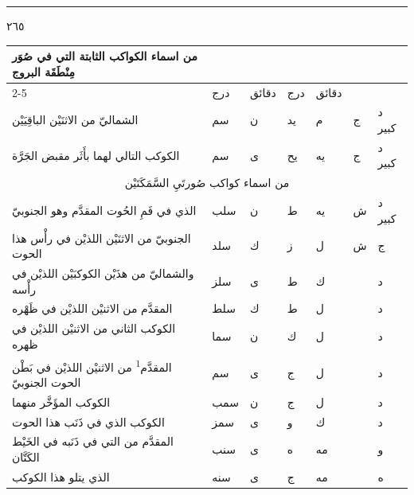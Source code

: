\documentclass[11pt]{article}
\begin{document}
\par\vspace{3mm}\noindent\rule{40mm}{.4pt}\par{}
\clearpage
{\large \textarabic{٢٦٥}}\par\vspace{2mm}
\begin{Arabic}\begin{tabular}{|p{84mm}|>{\centering\arraybackslash}p{9mm}|>{\centering\arraybackslash}p{9mm}|>{\centering\arraybackslash}p{9mm}|>{\centering\arraybackslash}p{9mm}|>{\centering\arraybackslash}p{14mm}|>{\centering\arraybackslash}p{17mm}|}\hline
\multirow{2}{*}{\parbox{80mm}{\centering من اسماء الكواكب الثابتة التي في صُوَر مِنْطَقَة البروج}} & \multicolumn{2}{c|}{الطول} & \multicolumn{2}{c|}{العرض} & \multirow{2}{*}{\parbox{13mm}{\centering\small علامات الجهة}} & \multirow{2}{*}{\parbox{16mm}{\centering\small مراتب العظمة}} \\ \cline{2-5}
 & {\small درج} & {\small دقائق} & {\small درج} & {\small دقائق} & & \\ \hline
الشماليّ من الاثنَيْن الباقِيَيْن & سم & ن & يد & م & ج & د كبير \\
الكوكب التالي لهما بأَثَر مقبض الجَرَّة & سم & ى & يح & يه & ج & د كبير \\
\hline
\multicolumn{7}{|c|}{\large من اسماء كواكب صُورتَيِ السَّمَكَتَيْن} \\ \hline
الذي في فَمِ الحُوت المقدَّم وهو الجنوبيّ & سلب & ن & ط & يه & ش & د كبير \\
الجنوبيّ من الاثنَيْن اللذيْن في رأْس هذا الحوت & سلد & ك & ز & ل & ش & ج \\
والشماليّ من هذَيْن الكوكبَيْن اللذيْن في رأْسه & سلز & ى & ط & ك &  & د \\
المقدَّم من الاثنيْن اللذيْن في ظَهْره & سلط & ك & ط & ل &  & د \\
الكوكب الثاني من الاثنيْن اللذيْن في ظهره & سما & ن & ك & ل &  & د \\
المقدَّم\textsuperscript{1} من الاثنيْن اللذيْن في بَطْن الحوت الجنوبيّ & سم & ى & ج & ل &  & د \\
الكوكب المؤَخَّر منهما & سمب & ن & ج & ل &  & د \\
الكوكب الذي في ذَنَب هذا الحوت & سمز & ى & و & ك &  & د \\
المقدَّم من التي في ذَنَبه في الخَيْط الكَتَّان & سنب & ى & ه & مه &  & و \\
الذي يتلو هذا الكوكب & سنه & ى & ج & مه &  & ه \\

\end{tabular}
\end{Arabic}
\end{document}
